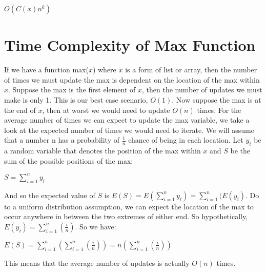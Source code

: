 \documentclass[12pt]{article}
\begin{document}
\begin{center}
$O(C(x)n^k)$
\end{center}

\pagebreak

\section{Time Complexity of Max Function}

If we have a function max($x$) where $x$ is a form of list or array, then the number of times we must update the max is dependent on the location of the max within $x$. Suppose the max is the first element of $x$, then the number of updates we must make is only 1. This is our best case scenario, $O(1)$. Now suppose the max is at the end of $x$, then at worst we would need to update $O(n)$ times. For the average number of times we can expect to update the max variable, we take a look at the expected number of times we would need to iterate. We will assume that a number n has a probability of $\frac{1}{n}$ chance of being in each location. Let $y_{i}$ be a random variable that denotes the position of the max within $x$ and $S$ be the sum of the possible positions of the max:
\begin{center}
$S = \sum_{i=1}^{n}y_{i}$
\end{center}
And so the expected value of $S$ is $E(S) = E(\sum_{i=1}^{n}y_{i}) = \sum_{i=1}^{n}(E(y_{i})$. Do to a uniform distribution assumption, we can expect the  location of the max to occur anywhere in between the two extremes of either end. So hypothetically, $E(y_{i}) = \sum_{i=1}^{n}(\frac{i}{n})$. So we have:
\begin{center}
$E(S) = \sum_{i=1}^{n}(\sum_{i=1}^{n}(\frac{i}{n})) = n(\sum_{i=1}^{n}(\frac{i}{n}))$
\end{center}
This means that the average number of updates is actually $O(n)$ times.
\end{document}
